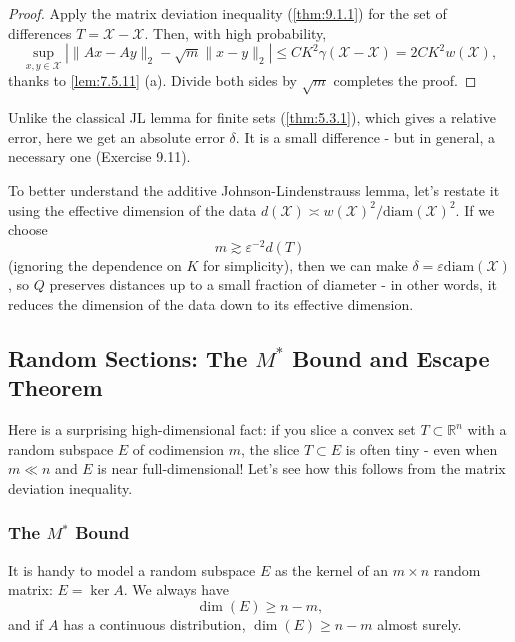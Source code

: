 \begin{proof}
Apply the matrix deviation inequality (\cref{thm:9.1.1}) for the set of differences $T = \mathcal{X}-
\mathcal{X}$. Then, with high probability, 
\[ \sup_{x, y \in \mathcal{X}} \left| \lVert Ax - Ay \rVert_{2} - \sqrt{m}\lVert x - y \rVert_{2} \right| 
\leq CK^2 \gamma(\mathcal{X}-\mathcal{X}) = 2CK^2 w(\mathcal{X}), \]
thanks to \cref{lem:7.5.11} (a). Divide both sides by $\sqrt{m}$ completes the proof.
\end{proof}

Unlike the classical JL lemma for finite sets (\cref{thm:5.3.1}), which gives a relative error, here we get an 
absolute error $\delta$. It is a small difference - but in general, a necessary one (Exercise 9.11).

\begin{remark}
\label{rmk:9.2.5}
To better understand the additive Johnson-Lindenstrauss lemma, let's restate it using the effective dimension of 
the data $d(\mathcal{X}) \asymp w(\mathcal{X})^2 / \mathrm{diam}(\mathcal{X})^2$. If we choose 
\[ m \gtrsim \varepsilon^{-2} d(T) \]
(ignoring the dependence on $K$ for simplicity), then we can make $\delta = \varepsilon \mathrm{diam}
(\mathcal{X})$, so $Q$ preserves distances up to a small fraction of diameter - in other words, it reduces the 
dimension of the data down to its effective dimension.
\end{remark}



\subsection{Random Sections: The \texorpdfstring{$M^*$}{} Bound and Escape Theorem}
Here is a surprising high-dimensional fact: if you slice a convex set $T \subset \mathbb{R}^n$ with a random 
subspace $E$ of codimension $m$, the slice $T \subset E$ is often tiny - even when $m \ll n$ and $E$ is near 
full-dimensional! Let's see how this follows from the matrix deviation inequality.


\subsubsection{The \texorpdfstring{$M^*$}{} Bound}
It is handy to model a random subspace $E$ as the kernel of an $m \times n$ random matrix: $E = \ker{A}$. We 
always have 
\[ \dim{(E)} \geq n - m, \]
and if $A$ has a continuous distribution, $\dim{(E)} \geq n - m$ almost surely.

